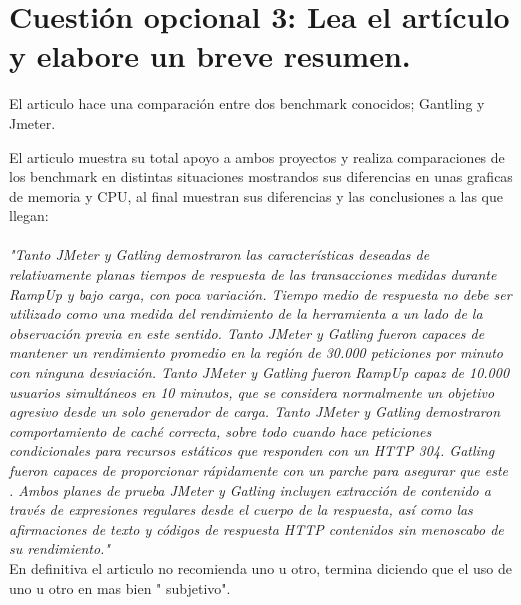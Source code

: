 \section*{Cuestión opcional 3: Lea el artículo y elabore un breve resumen.}
El articulo hace una comparación entre dos benchmark conocidos; Gantling y Jmeter.

El articulo muestra su total apoyo a ambos proyectos y realiza comparaciones de los benchmark en distintas situaciones mostrandos sus diferencias en unas graficas de memoria y CPU, al final muestran sus diferencias y las conclusiones  a las que llegan:
\\
\\
\textit{"Tanto JMeter y Gatling demostraron las características deseadas de relativamente planas tiempos de respuesta de las transacciones medidas durante RampUp y bajo carga, con poca variación. Tiempo medio de respuesta no debe ser utilizado como una medida del rendimiento de la herramienta a un lado de la observación previa en este sentido. Tanto JMeter y Gatling fueron capaces de mantener un rendimiento promedio en la región de 30.000 peticiones por minuto con ninguna desviación. Tanto JMeter y Gatling fueron RampUp capaz de 10.000 usuarios simultáneos en 10 minutos, que se considera normalmente un objetivo agresivo desde un solo generador de carga. Tanto JMeter y Gatling demostraron comportamiento de caché correcta, sobre todo cuando hace peticiones condicionales para recursos estáticos que responden con un HTTP 304. Gatling fueron capaces de proporcionar rápidamente con un parche para asegurar que este . Ambos planes de prueba JMeter y Gatling incluyen extracción de contenido a través de expresiones regulares desde el cuerpo de la respuesta, así como las afirmaciones de texto y códigos de respuesta HTTP contenidos sin menoscabo de su rendimiento."}
\\
En definitiva el articulo no recomienda uno u otro, termina diciendo que el uso de uno u otro en mas bien " subjetivo".
